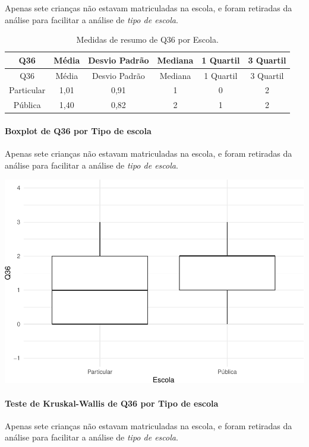 \documentclass[]{article}
\let\oldparagraph\paragraph
\renewcommand{\paragraph}[1]{\oldparagraph{#1}\mbox{}}
\begin{document}
Apenas sete crianças não estavam matriculadas na escola, e foram retiradas da análise para facilitar a análise de \emph{tipo de escola}.

\begin{longtable}[]{@{}cccccc@{}}
\caption{\label{tab:unnamed-chunk-1355}Medidas de resumo de Q36 por Escola.}\tabularnewline
\toprule
Q36 & Média & Desvio Padrão & Mediana & 1 Quartil & 3 Quartil\tabularnewline
\midrule
\endfirsthead
\toprule
Q36 & Média & Desvio Padrão & Mediana & 1 Quartil & 3 Quartil\tabularnewline
\midrule
\endhead
Particular & 1,01 & 0,91 & 1 & 0 & 2\tabularnewline
Pública & 1,40 & 0,82 & 2 & 1 & 2\tabularnewline
\bottomrule
\end{longtable}

\hypertarget{boxplot-de-q36-por-tipo-de-escola}{%
\paragraph{Boxplot de Q36 por Tipo de escola}\label{boxplot-de-q36-por-tipo-de-escola}}

Apenas sete crianças não estavam matriculadas na escola, e foram retiradas da análise para facilitar a análise de \emph{tipo de escola}.

\begin{center}\includegraphics[width=0.75\linewidth]{relatorio_covid19_files/figure-latex/unnamed-chunk-1356-1} \end{center}

\hypertarget{teste-de-kruskal-wallis-de-q36-por-tipo-de-escola}{%
\paragraph{Teste de Kruskal-Wallis de Q36 por Tipo de escola}\label{teste-de-kruskal-wallis-de-q36-por-tipo-de-escola}}

Apenas sete crianças não estavam matriculadas na escola, e foram retiradas da análise para facilitar a análise de \emph{tipo de escola}.
\end{document}
